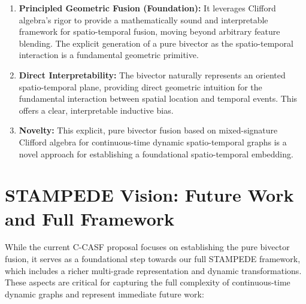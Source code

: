 \documentclass[11pt]{article}
\begin{document}
\begin{itemize}
\begin{enumerate}
    \item \textbf{Principled Geometric Fusion (Foundation):} It leverages Clifford algebra's rigor to provide a mathematically sound and interpretable framework for spatio-temporal fusion, moving beyond arbitrary feature blending. The explicit generation of a pure bivector as the spatio-temporal interaction is a fundamental geometric primitive.
    \item \textbf{Direct Interpretability:} The bivector naturally represents an oriented spatio-temporal plane, providing direct geometric intuition for the fundamental interaction between spatial location and temporal events. This offers a clear, interpretable inductive bias.
    \item \textbf{Novelty:} This explicit, pure bivector fusion based on mixed-signature Clifford algebra for continuous-time dynamic spatio-temporal graphs is a novel approach for establishing a foundational spatio-temporal embedding.
\end{enumerate}

\section{STAMPEDE Vision: Future Work and Full Framework}
\label{sec:future_vision}

While the current C-CASF proposal focuses on establishing the pure bivector fusion, it serves as a foundational step towards our full STAMPEDE framework, which includes a richer multi-grade representation and dynamic transformations. These aspects are critical for capturing the full complexity of continuous-time dynamic graphs and represent immediate future work:


\end{itemize}
\end{document}
